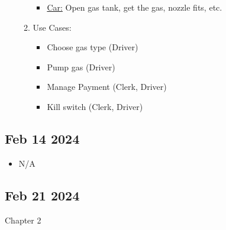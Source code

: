 \documentclass[12pt]{article}
\begin{document}
\begin{itemize}
\begin{enumerate}
\begin{itemize}
													 \item \underline{Car:} Open gas tank, get the gas, nozzle fits,
																etc. 
										  \end{itemize}
								\item Use Cases:
										  \begin{itemize}
													 \item Choose gas type (Driver)
													 \item Pump gas (Driver)
													 \item Manage Payment (Clerk, Driver)
													 \item Kill switch (Clerk, Driver)
										  \end{itemize}
					 \end{enumerate}
\end{itemize}

\subsection*{Feb 14 2024}

\begin{itemize}
		  \item N/A 
\end{itemize}

\subsection*{Feb 21 2024}

Chapter 2
\end{document}
